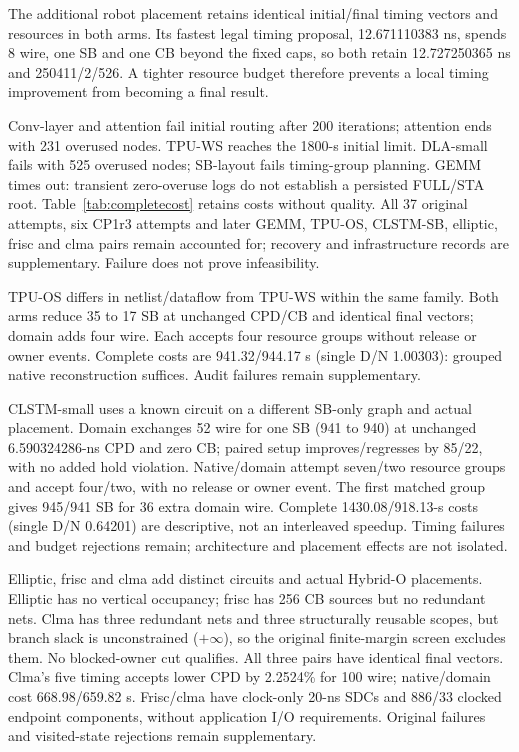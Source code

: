 \documentclass[conference,10pt]{IEEEtran}
\begin{document}
The additional robot placement retains identical initial/final timing vectors and resources in both arms. Its fastest legal timing proposal, 12.671110383 ns, spends 8 wire, one SB and one CB beyond the fixed caps, so both retain 12.727250365 ns and 250411/2/526. A tighter resource budget therefore prevents a local timing improvement from becoming a final result.

Conv-layer and attention fail initial routing after 200 iterations; attention ends with 231 overused nodes. TPU-WS reaches the 1800-s initial limit. DLA-small fails with 525 overused nodes; SB-layout fails timing-group planning. GEMM times out: transient zero-overuse logs do not establish a persisted FULL/STA root. Table~\ref{tab:completecost} retains costs without quality. All 37 original attempts, six CP1r3 attempts and later GEMM, TPU-OS, CLSTM-SB, elliptic, frisc and clma pairs remain accounted for; recovery and infrastructure records are supplementary. Failure does not prove infeasibility.

TPU-OS differs in netlist/dataflow from TPU-WS within the same family. Both arms reduce 35 to 17 SB at unchanged CPD/CB and identical final vectors; domain adds four wire. Each accepts four resource groups without release or owner events. Complete costs are 941.32/944.17 s (single D/N 1.00303): grouped native reconstruction suffices. Audit failures remain supplementary.

CLSTM-small uses a known circuit on a different SB-only graph and actual placement. Domain exchanges 52 wire for one SB (941 to 940) at unchanged 6.590324286-ns CPD and zero CB; paired setup improves/regresses by 85/22, with no added hold violation. Native/domain attempt seven/two resource groups and accept four/two, with no release or owner event. The first matched group gives 945/941 SB for 36 extra domain wire. Complete 1430.08/918.13-s costs (single D/N 0.64201) are descriptive, not an interleaved speedup. Timing failures and budget rejections remain; architecture and placement effects are not isolated.

Elliptic, frisc and clma add distinct circuits and actual Hybrid-O placements. Elliptic has no vertical occupancy; frisc has 256 CB sources but no redundant nets. Clma has three redundant nets and three structurally reusable scopes, but branch slack is unconstrained ($+\infty$), so the original finite-margin screen excludes them. No blocked-owner cut qualifies. All three pairs have identical final vectors. Clma's five timing accepts lower CPD by 2.2524\% for 100 wire; native/domain cost 668.98/659.82 s. Frisc/clma have clock-only 20-ns SDCs and 886/33 clocked endpoint components, without application I/O requirements. Original failures and visited-state rejections remain supplementary.
\end{document}
